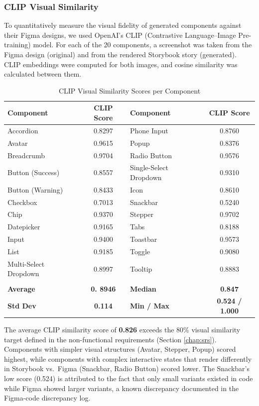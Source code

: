 \subsubsection{CLIP Visual Similarity}

To quantitatively measure the visual fidelity of generated components against their Figma designs, we used OpenAI's CLIP (Contrastive Language--Image Pre-training) model. For each of the 20 components, a screenshot was taken from the Figma design (original) and from the rendered Storybook story (generated). CLIP embeddings were computed for both images, and cosine similarity was calculated between them.

\begin{table}[H]
\centering
\caption{CLIP Visual Similarity Scores per Component}
\label{tab:clip_results}
\begin{tabular}{|l|c||l|c|}
\hline
\textbf{Component} & \textbf{CLIP Score} & \textbf{Component} & \textbf{CLIP Score} \\ \hline
Accordion & 0.8297 & Phone Input & 0.8760 \\ \hline
Avatar & 0.9615 & Popup & 0.8376 \\ \hline
Breadcrumb & 0.9704 & Radio Button & 0.9576 \\ \hline
Button (Success) & 0.8557 & Single-Select Dropdown & 0.9310 \\ \hline
Button (Warning) & 0.8433 & Icon & 0.8610 \\ \hline
Checkbox & 0.7013 & Snackbar & 0.5240 \\ \hline
Chip & 0.9370 & Stepper & 0.9702 \\ \hline
Datepicker & 0.9165 & Tabs & 0.8188 \\ \hline
Input & 0.9400 & Toastbar & 0.9573 \\ \hline
List & 0.9185 & Toggle & 0.9080 \\ \hline
Multi-Select Dropdown & 0.8997 & Tooltip & 0.8883 \\ \hline
\multicolumn{4}{c}{} \\ \hline
\textbf{Average} & \textbf{0. 8946} & \textbf{Median} & \textbf{0.847} \\ \hline
\textbf{Std Dev} & \textbf{0.114} & \textbf{Min / Max} & \textbf{0.524 / 1.000} \\ \hline
\end{tabular}
\end{table}

The average CLIP similarity score of \textbf{0.826} exceeds the 80\% visual similarity target defined in the non-functional requirements (Section \ref{chap:srs}). Components with simpler visual structures (Avatar, Stepper, Popup) scored highest, while components with complex interactive states that render differently in Storybook vs.\ Figma (Snackbar, Radio Button) scored lower. The Snackbar's low score (0.524) is attributed to the fact that only small variants existed in code while Figma showed larger variants, a known discrepancy documented in the Figma-code discrepancy log.

